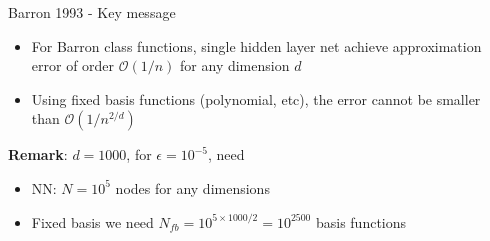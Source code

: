 \documentclass[aspectratio=169]{beamer} %
\begin{document}
\begin{frame}{Barron 1993 - Key message}
\begin{itemize}
    \item For Barron class functions, single hidden layer net achieve approximation error of order $\mathcal{O}(1/n)$ for any dimension $d$
    \item Using fixed basis functions (polynomial, etc), the error cannot be smaller than $\mathcal{O}(1/n^{2/d})$
\end{itemize}
    \textbf{Remark}: $d=1000$, for $\epsilon = 10^{-5}$, need 
\begin{itemize}
    \item NN: $N = 10^5$ nodes for any dimensions
    \item Fixed basis we need $N_{fb} = 10^{5\times 1000/2} =10^{2500}$ basis functions
\end{itemize}
\end{frame}
\end{document}

